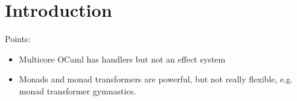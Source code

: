 \section{Introduction}
Points:
\begin{itemize}
  \item Multicore OCaml has handlers but not an effect system
  \item Monads and monad transformers are powerful, but not really flexible, e.g. monad transformer gymnastics.
\end{itemize}